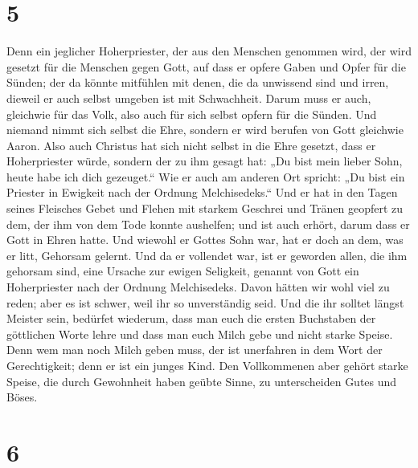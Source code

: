 \hypertarget{section-4}{%
\section{5}\label{section-4}}

 Denn ein jeglicher Hoherpriester, der aus den Menschen
genommen wird, der wird gesetzt für die Menschen gegen Gott, auf dass er
opfere Gaben und Opfer für die Sünden;  der da könnte
mitfühlen mit denen, die da unwissend sind und irren, dieweil er auch
selbst umgeben ist mit Schwachheit.  Darum muss er auch,
gleichwie für das Volk, also auch für sich selbst opfern für die Sünden.
 Und niemand nimmt sich selbst die Ehre, sondern er wird
berufen von Gott gleichwie Aaron.  Also auch Christus hat
sich nicht selbst in die Ehre gesetzt, dass er Hoherpriester würde,
sondern der zu ihm gesagt hat: „Du bist mein lieber Sohn, heute habe ich
dich gezeuget.``  Wie er auch am anderen Ort spricht: „Du
bist ein Priester in Ewigkeit nach der Ordnung Melchisedeks.``
 Und er hat in den Tagen seines Fleisches Gebet und Flehen
mit starkem Geschrei und Tränen geopfert zu dem, der ihm von dem Tode
konnte aushelfen; und ist auch erhört, darum dass er Gott in Ehren
hatte.  Und wiewohl er Gottes Sohn war, hat er doch an
dem, was er litt, Gehorsam gelernt.  Und da er vollendet
war, ist er geworden allen, die ihm gehorsam sind, eine Ursache zur
ewigen Seligkeit,  genannt von Gott ein Hoherpriester
nach der Ordnung Melchisedeks.  Davon hätten wir wohl
viel zu reden; aber es ist schwer, weil ihr so unverständig seid.
 Und die ihr solltet längst Meister sein, bedürfet
wiederum, dass man euch die ersten Buchstaben der göttlichen Worte lehre
und dass man euch Milch gebe und nicht starke Speise. 
Denn wem man noch Milch geben muss, der ist unerfahren in dem Wort der
Gerechtigkeit; denn er ist ein junges Kind.  Den
Vollkommenen aber gehört starke Speise, die durch Gewohnheit haben
geübte Sinne, zu unterscheiden Gutes und Böses.

\hypertarget{section-5}{%
\section{6}\label{section-5}}

